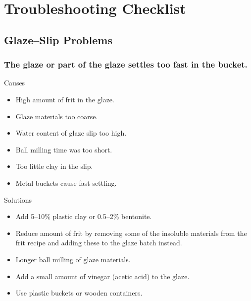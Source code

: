 \section{Troubleshooting Checklist}
\subsection{Glaze--Slip Problems}
\subsubsection{The glaze or part of the glaze settles too fast in the bucket.}
Causes
\begin{itemize}
\item High amount of frit in the glaze.
\item Glaze materials too coarse.
\item Water content of glaze slip too high.
\item Ball milling time was too short.
\item Too little clay in the slip.
\item Metal buckets cause fast settling.
\end{itemize}
Solutions
\begin{itemize}
\item Add 5--10\% plastic clay or 0.5--2\% bentonite.
\item Reduce amount of frit by removing some of the insoluble materials from 
the frit recipe and adding these to the glaze batch instead.
\item Longer ball milling of glaze materials.
\item Add a small amount of vinegar (acetic acid) to the glaze.
\item Use plastic buckets or wooden containers.
\end{itemize}
